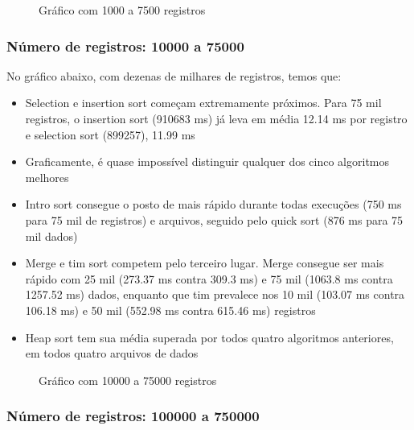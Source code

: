 \documentclass[a4paper,12pt]{scrartcl}
\begin{document}
\begin{figure}[H]
    \centering
    
    \caption{Gráfico com 1000 a 7500 registros}
    \label{mapaSelect}
\end{figure}

\subsubsection{Número de registros: 10000 a 75000}

No gráfico abaixo, com dezenas de milhares de registros, temos que:
\begin{itemize}
    \item
    Selection e insertion sort começam extremamente próximos. Para 75 mil registros, o insertion sort (910683 ms) já leva em média 12.14 ms por registro e selection sort (899257), 11.99 ms
    
    \item
    Graficamente, é quase impossível distinguir qualquer dos cinco algoritmos melhores
    
    \item
    Intro sort consegue o posto de mais rápido durante todas execuções (750 ms para 75 mil de registros) e arquivos, seguido pelo quick sort (876 ms para 75 mil dados)
    
    \item Merge e tim sort competem pelo terceiro lugar. Merge consegue ser mais rápido com 25 mil (273.37 ms contra 309.3 ms) e 75 mil (1063.8 ms contra 1257.52 ms) dados, enquanto que tim prevalece nos 10 mil (103.07 ms contra 106.18 ms) e 50 mil (552.98 ms contra 615.46 ms) registros
    
    \item
    Heap sort tem sua média superada por todos quatro algoritmos anteriores, em todos quatro arquivos de dados

\end{itemize}

\begin{figure}[H]
    \centering
    
    \caption{Gráfico com 10000 a 75000 registros}
    \label{mapaSelect}
\end{figure}

\subsubsection{Número de registros: 100000 a 750000}
\end{document}
